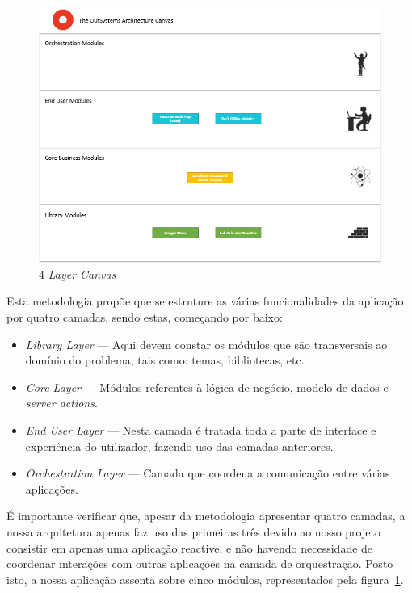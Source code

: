 \documentclass[a4paper,openright,11pt]{report}
\begin{document}
\begin{figure}[h]
  \centering 
  \includegraphics[scale=0.7]{figures/4LayerCanvas.png}
  \caption{4 \textit{Layer Canvas}}\label{fig:4lc}
\end{figure}

Esta metodologia propõe que se estruture as várias funcionalidades da aplicação por quatro camadas, sendo estas, começando por baixo: 

\begin{itemize}
    \item \textit{Library Layer} --- Aqui devem constar os módulos que são transversais ao domínio do problema, tais como: temas, bibliotecas, etc. 
    \item \textit{Core Layer} --- Módulos referentes à lógica de negócio, modelo de dados e \textit{server actions}. 
    \item \textit{End User Layer} --- Nesta camada é tratada toda a parte de interface e experiência do utilizador, fazendo uso das camadas anteriores. 
    \item \textit{Orchestration Layer} --- Camada que coordena a comunicação entre várias aplicações. 
\end{itemize}

É importante verificar que, apesar da metodologia apresentar quatro camadas, 
a nossa arquitetura apenas faz uso das primeiras três devido ao nosso projeto consistir em apenas uma aplicação reactive, 
e não havendo necessidade de coordenar interações com outras aplicações na camada de orquestração. 
Posto isto, a nossa aplicação assenta sobre cinco módulos, representados pela figura~\ref{fig:4lc}.
\end{document}
